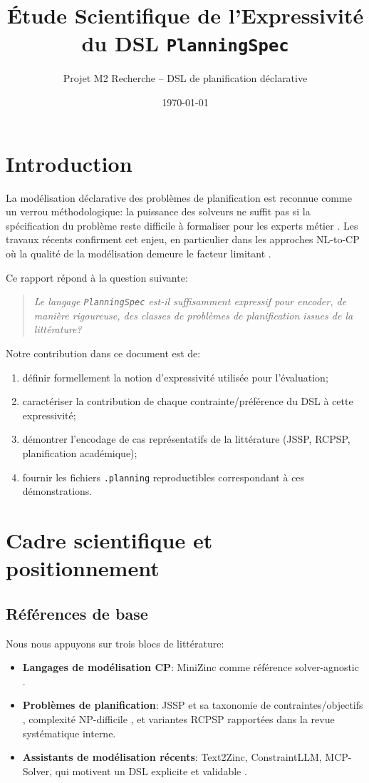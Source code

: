 \documentclass[12pt,a4paper]{article}
\title{Étude Scientifique de l'Expressivité du DSL \texttt{PlanningSpec}}
\author{Projet M2 Recherche -- DSL de planification déclarative}
\date{\today}
\begin{document}
\maketitle
\tableofcontents
\newpage

\section{Introduction}
La modélisation déclarative des problèmes de planification est reconnue comme un verrou méthodologique: la puissance des solveurs ne suffit pas si la spécification du problème reste difficile à formaliser pour les experts métier \cite{marriott1998cp,constraintllm2025}. Les travaux récents confirment cet enjeu, en particulier dans les approches NL-to-CP où la qualité de la modélisation demeure le facteur limitant \cite{text2zinc2025,song2025llmcp,szeider2025mcp}.

Ce rapport répond à la question suivante:
\begin{quote}
\emph{Le langage \texttt{PlanningSpec} est-il suffisamment expressif pour encoder, de manière rigoureuse, des classes de problèmes de planification issues de la littérature?}
\end{quote}

Notre contribution dans ce document est de:
\begin{enumerate}[label=\textbf{C\arabic*.}]
  \item définir formellement la notion d'expressivité utilisée pour l'évaluation;
  \item caractériser la contribution de chaque contrainte/préférence du DSL à cette expressivité;
  \item démontrer l'encodage de cas représentatifs de la littérature (JSSP, RCPSP, planification académique);
  \item fournir les fichiers \texttt{.planning} reproductibles correspondant à ces démonstrations.
\end{enumerate}

\section{Cadre scientifique et positionnement}
\subsection{Références de base}
Nous nous appuyons sur trois blocs de littérature:
\begin{itemize}
  \item \textbf{Langages de modélisation CP}: MiniZinc comme référence solver-agnostic \cite{nethercote2007minizinc}.
  \item \textbf{Problèmes de planification}: JSSP et sa taxonomie de contraintes/objectifs \cite{abdolrazzagh2017jssp}, complexité NP-difficile \cite{garey1976jssp}, et variantes RCPSP rapportées dans la revue systématique interne.
  \item \textbf{Assistants de modélisation récents}: Text2Zinc, ConstraintLLM, MCP-Solver, qui motivent un DSL explicite et validable \cite{text2zinc2025,constraintllm2025,szeider2025mcp}.
\end{itemize}
\end{document}

